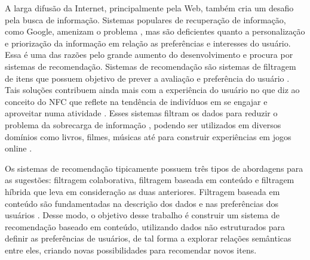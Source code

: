 A larga difusão da Internet, principalmente pela Web, também cria um desafio pela busca de informação. Sistemas populares de recuperação de informação, como Google, amenizam o problema \citep{ISINKAYE2015261}, mas são deficientes quanto a personalização e priorização da informação em relação as preferências e interesses do usuário. Essa é uma das razões pelo grande aumento do desenvolvimento e procura por sistemas de recomendação. Sistemas de recomendação são sistemas de filtragem de itens que possuem objetivo de prever a avaliação e preferência do usuário \citep{Ricci2011}. Tais soluções contribuem ainda mais com a experiência do usuário no que diz ao conceito do \ac{NFC} que reflete na tendência de indivíduos em se engajar e aproveitar numa atividade \citep{Mykolas:2015a}. Esses sistemas filtram os dados para reduzir o problema da sobrecarga de informação \citep{Konstan2012}, podendo ser utilizados em diversos domínios como livros, filmes, músicas até para construir experiências em jogos online \citep{Activision:Glixel}.

Os sistemas de recomendação tipicamente possuem três tipos de abordagens para as sugestões: filtragem colaborativa, filtragem baseada em conteúdo e filtragem híbrida que leva em consideração as duas anteriores. Filtragem baseada em conteúdo são fundamentadas na descrição dos dados e nas preferências dos usuários \citep{Aggarwal2016}. Desse modo, o objetivo desse trabalho é construir um sistema de recomendação baseado em conteúdo, utilizando dados não estruturados para definir as preferências de usuários, de tal forma a explorar relações semânticas entre eles, criando novas possibilidades para recomendar novos itens.

